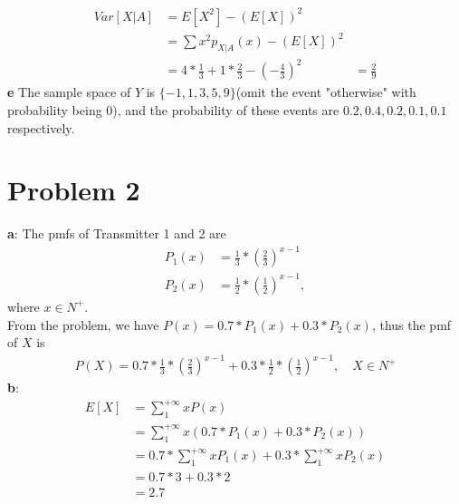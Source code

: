 \documentclass[12pt,letterpaper]{article}
\begin{document}
    \begin{equation*}
        \begin{aligned}
            Var[X | A] &= E[X^{2}] - (E[X])^{2} \\
            &= \sum x^{2}p_{X | A}(x) - (E[X])^{2} \\
            &= 4 * \frac{1}{3} + 1 * \frac{2}{3} - (-\frac{4}{3})^{2}
            &= \frac{2}{9}
        \end{aligned}
    \end{equation*}
    \textbf{e} The sample space of $Y$ is $\{-1, 1, 3, 5, 9\}$(omit the event "otherwise" with probability being 0), and the probability of these events are $0.2, 0.4, 0.2, 0.1, 0.1$ respectively.

\section*{Problem 2}
    \textbf{a}: The pmfs of Transmitter 1 and 2 are
        \begin{equation*}
            \begin{aligned}
                P_{1}(x) &= \frac{1}{3} * (\frac{2}{3})^{x - 1} \\
                P_{2}(x) &= \frac{1}{2} * (\frac{1}{2})^{x - 1},
            \end{aligned}
        \end{equation*}
    where $x \in N^{+}$. \\
    From the problem, we have $P(x) = 0.7 * P_{1}(x) + 0.3 * P_{2}(x)$, thus the pmf of $X$ is
        \begin{equation*}
            \begin{aligned}
                P(X) = 0.7 * \frac{1}{3} * (\frac{2}{3})^{x - 1} + 0.3 * \frac{1}{2} * (\frac{1}{2})^{x - 1}, \quad X \in N^{+}
            \end{aligned}
        \end{equation*}
    \textbf{b}:
        \begin{equation*}
            \begin{aligned}
                E[X] &= \sum_{1}^{+\infty} xP(x) \\
                &= \sum_{1}^{+\infty} x(0.7 * P_{1}(x) + 0.3 * P_{2}(x)) \\
                &= 0.7 * \sum_{1}^{+\infty} xP_{1}(x) + 0.3 * \sum_{1}^{+\infty} xP_{2}(x) \\
                &= 0.7 * 3 + 0.3 * 2 \\
                &= 2.7
            \end{aligned}
        \end{equation*}
\end{document}
